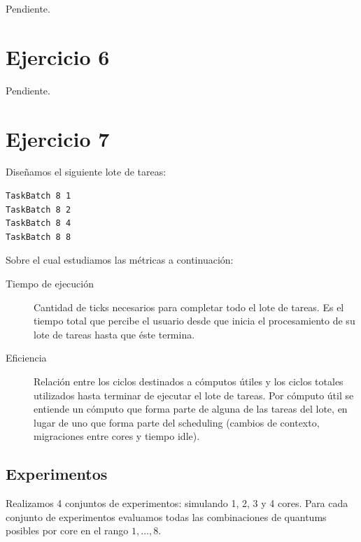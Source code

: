 \documentclass[a4paper,10pt,twoside]{article}
\begin{document}
Pendiente.




\section{Ejercicio 6}

Pendiente.




\section{Ejercicio 7}

Diseñamos el siguiente lote de tareas:

\begin{verbatim}
TaskBatch 8 1
TaskBatch 8 2
TaskBatch 8 4
TaskBatch 8 8
\end{verbatim}

Sobre el cual estudiamos las métricas a continuación:

\begin{description}
	\item[Tiempo de ejecución]
	Cantidad de ticks necesarios para completar todo el lote de tareas. Es el tiempo total que percibe el usuario desde que inicia el procesamiento de su lote de tareas hasta que éste termina.

	\item[Eficiencia]
	Relación entre los ciclos destinados a cómputos útiles y los ciclos totales utilizados hasta terminar de ejecutar el lote de tareas. Por cómputo útil se entiende un cómputo que forma parte de alguna de las tareas del lote, en lugar de uno que forma parte del scheduling (cambios de contexto, migraciones entre cores y tiempo idle).
\end{description}


\subsection{Experimentos}

Realizamos 4 conjuntos de experimentos: simulando 1, 2, 3 y 4 cores. Para cada conjunto de experimentos evaluamos todas las combinaciones de quantums posibles por core en el rango $1, \ldots, 8$.
\end{document}
